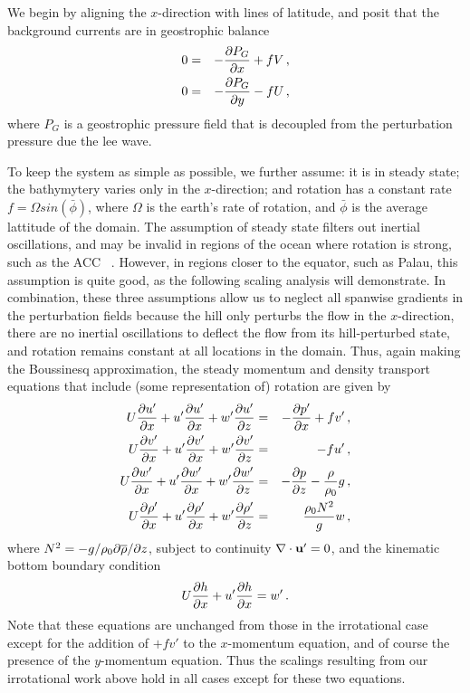 \documentclass[12pt]{article}
\begin{document}
We begin by aligning the $x$-direction with lines of latitude, and posit that the background currents are in geostrophic balance
\begin{eqnarray*}
	0 &=& -\frac{\partial{P_G}}{\partial{x}} + fV \,,\\
	0 &=& -\frac{\partial{P_G}}{\partial{y}} - fU \,,\\
\end{eqnarray*}
where $P_G$ is a geostrophic pressure field that is decoupled from the perturbation pressure due the lee wave. 

To keep the system as simple as possible, we further assume: it is in steady state; the bathymytery varies only in the $x$-direction; and rotation has a constant rate $f=\Omega sin(\bar{\phi})$, where $\Omega$ is the earth's rate of rotation, and $\bar{\phi}$ is the average lattitude of the domain. The assumption of steady state filters out inertial oscillations, and may be invalid in regions of the ocean where rotation is strong, such as the ACC ~\citep{Nikurashin2010a}. However, in regions closer to the equator, such as Palau, this assumption is quite good, as the following scaling analysis will demonstrate.  In combination, these three assumptions allow us to neglect all spanwise gradients in the perturbation fields because the hill only perturbs the flow in the $x$-direction, there are no inertial oscillations to deflect the flow from its hill-perturbed state, and rotation remains constant at all locations in the domain. Thus, again making the Boussinesq approximation, the steady momentum and density transport equations that include (some representation of) rotation are given by
\begin{eqnarray*}
	U \frac{\partial{u'}}{\partial{x}} +u' \frac{\partial{u'}}{\partial{x}} + w' \frac{\partial{u'}}{\partial{z}} &=& -\frac{\partial{p'}}{\partial{x}} + fv' \,,\\
	U \frac{\partial{v'}}{\partial{x}} + u' \frac{\partial{v'}}{\partial{x}} + w' \frac{\partial{v'}}{\partial{z}} &=& - fu' \,,\\
	U \frac{\partial{w'}}{\partial{x}} + u' \frac{\partial{w'}}{\partial{x}} + w' \frac{\partial{w'}}{\partial{z}} &=& -\frac{\partial{p}}{\partial{z}} - \frac{\rho}{\rho_0} g \,,\\
	U \frac{\partial{\rho'}}{\partial{x}} + u' \frac{\partial{\rho'}}{\partial{x}} + w' \frac{\partial{\rho'}}{\partial{z}} &=& \frac{\rho_0 N^2}{g} w\,,
\end{eqnarray*}
where $N^2 = -g/\rho_0 \partial\overline{\rho}/\partial z$, subject to continuity $\nabla\cdot\mathbf{u}'=0$, and
the kinematic bottom boundary condition
\[
U\frac{\partial{h}}{\partial{x}} + u' \frac{\partial{h}}{\partial{x}} = w'\,.
\]  
Note that these equations are unchanged from those in the irrotational case except for the addition of $+fv'$ to the $x$-momentum equation, and of course the presence of the $y$-momentum equation. Thus the scalings resulting from our irrotational work above hold in all cases except for these two equations. 
\end{document}
